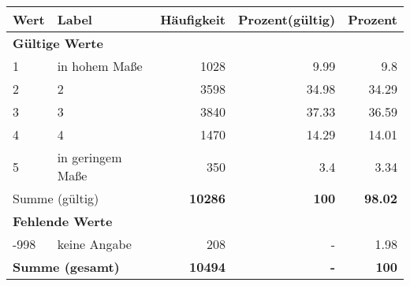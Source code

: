      \begin{longtable}{lXrrr}
     \toprule
     \textbf{Wert} & \textbf{Label} & \textbf{Häufigkeit} & \textbf{Prozent(gültig)} & \textbf{Prozent} \\
     \endhead
     \midrule
     \multicolumn{5}{l}{\textbf{Gültige Werte}}\\

     1 &
     \multicolumn{1}{X}{ in hohem Maße   } &


       \num{1028} &
       \num[round-mode=places,round-precision=2]{9,99} &
         \num[round-mode=places,round-precision=2]{9,8} \\

     2 &
     \multicolumn{1}{X}{ 2   } &


       \num{3598} &
       \num[round-mode=places,round-precision=2]{34,98} &
         \num[round-mode=places,round-precision=2]{34,29} \\

     3 &
     \multicolumn{1}{X}{ 3   } &


       \num{3840} &
       \num[round-mode=places,round-precision=2]{37,33} &
         \num[round-mode=places,round-precision=2]{36,59} \\

     4 &
     \multicolumn{1}{X}{ 4   } &


       \num{1470} &
       \num[round-mode=places,round-precision=2]{14,29} &
         \num[round-mode=places,round-precision=2]{14,01} \\

     5 &
     \multicolumn{1}{X}{ in geringem Maße   } &


       \num{350} &
       \num[round-mode=places,round-precision=2]{3,4} &
         \num[round-mode=places,round-precision=2]{3,34} \\
     \midrule
     \multicolumn{2}{l}{Summe (gültig)} &
       \textbf{\num{10286}} &
     \textbf{100} &
       \textbf{\num[round-mode=places,round-precision=2]{98,02}} \\
     \multicolumn{5}{l}{\textbf{Fehlende Werte}}\\
       -998 &
       keine Angabe &
         \num{208} &
        - &
         \num[round-mode=places,round-precision=2]{1,98} \\
     \midrule
     \multicolumn{2}{l}{\textbf{Summe (gesamt)}} &
          \textbf{\num{10494}} &
        \textbf{-} &
        \textbf{100} \\
     \bottomrule
     \end{longtable}
     
